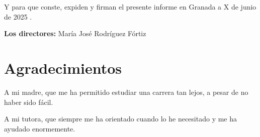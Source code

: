 \vspace{0.5cm}

Y para que conste, expiden y firman el presente informe en Granada a X de junio de 2025 .

\vspace{1cm}

\textbf{Los directores:} 
	María José Rodríguez Fórtiz

\vspace{5cm}

\noindent \textbf{\myProf}

\chapter*{Agradecimientos}
\thispagestyle{empty}

       \vspace{1cm}


A mi madre, que me ha permitido estudiar una carrera tan lejos, a pesar de no haber sido fácil.

A mi tutora, que siempre me ha orientado cuando lo he necesitado y me ha ayudado enormemente.

